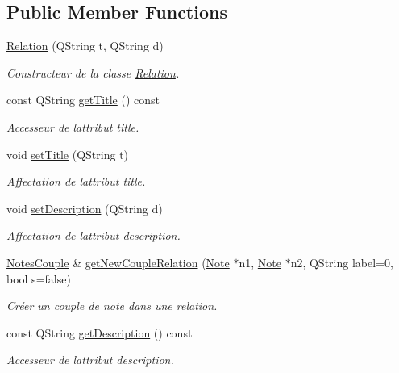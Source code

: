 \subsection*{Public Member Functions}
\begin{DoxyCompactItemize}
\item 
\hyperlink{class_relation_ac665710061b98c5e13acaf3d9c5f68f6}{Relation} (Q\+String t, Q\+String d)
\begin{DoxyCompactList}\small\item\em Constructeur de la classe \hyperlink{class_relation}{Relation}. \end{DoxyCompactList}\item 
const Q\+String \hyperlink{class_relation_aef1db31b9f1a2dc79a1688d4e466e2b1}{get\+Title} () const
\begin{DoxyCompactList}\small\item\em Accesseur de l\textquotesingle{}attribut title. \end{DoxyCompactList}\item 
void \hyperlink{class_relation_a5fff5d6907d6a183b26ff4949d8d4ea2}{set\+Title} (Q\+String t)
\begin{DoxyCompactList}\small\item\em Affectation de l\textquotesingle{}attribut title. \end{DoxyCompactList}\item 
void \hyperlink{class_relation_a08ff278f3bd0bdfff1c13de693d982b9}{set\+Description} (Q\+String d)
\begin{DoxyCompactList}\small\item\em Affectation de l\textquotesingle{}attribut description. \end{DoxyCompactList}\item 
\hyperlink{class_notes_couple}{Notes\+Couple} \& \hyperlink{class_relation_a69211cc18aed20c1df97c4b73317a2e1}{get\+New\+Couple\+Relation} (\hyperlink{class_note}{Note} $\ast$n1, \hyperlink{class_note}{Note} $\ast$n2, Q\+String label=0, bool s=false)
\begin{DoxyCompactList}\small\item\em Créer un couple de note dans une relation. \end{DoxyCompactList}\item 
const Q\+String \hyperlink{class_relation_a925c2f709d5909121d60c2ab203eb201}{get\+Description} () const
\begin{DoxyCompactList}\small\item\em Accesseur de l\textquotesingle{}attribut description. \end{DoxyCompactList}\item 

\end{DoxyCompactItemize}
